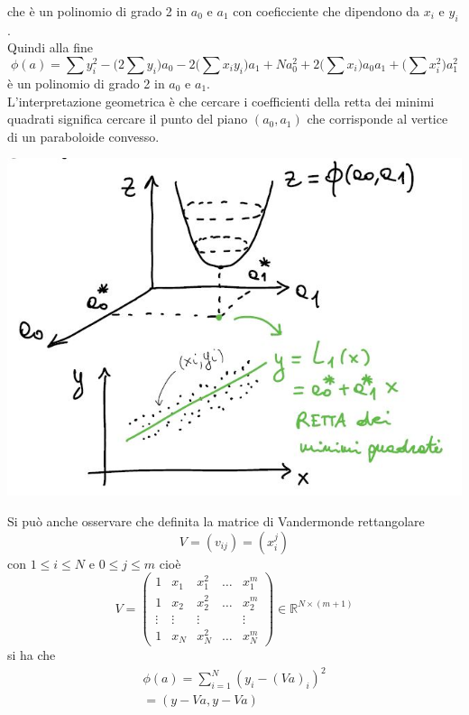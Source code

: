 \documentclass[12pt,a4paper]{article}
\begin{document}
che è un polinomio di grado 2 in $a_0$ e $a_1$ con coeficciente che dipendono da $x_i$ e $y_i$. \\
Quindi alla fine
\begin{equation*}
    \phi(a) = \sum y_i^2 - \biggl( 2\sum y_i \biggr) a_0 - 2\biggl( \sum x_iy_i \biggr)a_1 + Na_0^2 + 2\biggl( \sum x_i \biggr)a_0a_1 + \biggl( \sum x_i^2 \biggr)a_1^2
\end{equation*}
è un polinomio di grado 2 in $a_0$ e $a_1$.\\
L'interpretazione geometrica è che cercare i coefficienti della retta dei minimi quadrati significa cercare il punto del piano $(a_0,a_1)$ che corrisponde al vertice di un paraboloide convesso.
\begin{center}
    \includegraphics[scale=0.7]{calcolo12.JPG}
\end{center}
Si può anche osservare che definita la matrice di Vandermonde rettangolare
\[
V = (v_{ij}) = (x_i^j)
\]
con $1 \leq i \leq N$ e $0 \leq j \leq m$ cioè\\
\[
V = 
\begin{pmatrix}
1 & x_1 & x_1^2 & \dotso & x_1^m \\
1 & x_2 & x_2^2 & \dotso & x_2^m \\
\vdots & \vdots & \vdots & & \vdots \\
1 & x_N & x_N^2 & \dotso & x_N^m
\end{pmatrix}
\in \mathbb{R}^{N \times (m+1)}
\]
si ha che
\[
\begin{split}
    \phi (a) = \sum_{i=1}^N (y_i - (Va)_i)^2\\
    = (y - Va, y - Va)
\end{split}
\]
\end{document}
